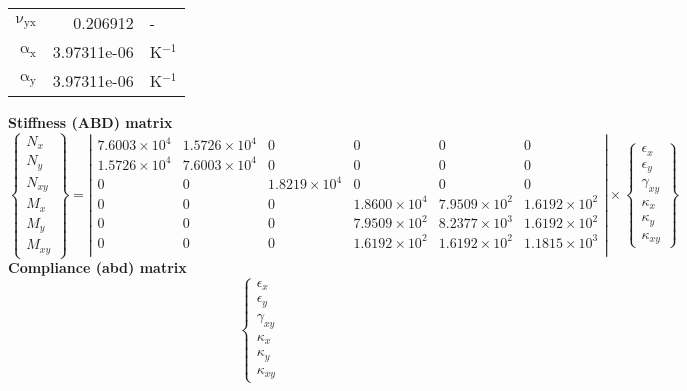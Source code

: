 \begin{table}[!htbp]
\begin{tabular}[t]{rrl}
      $\mathrm{\nu_{yx}}$ & 0.206912 &-\\
      $\mathrm{\alpha_x}$ & 3.97311e-06 & K$^{-1}$\\
      $\mathrm{\alpha_y}$ & 3.97311e-06 & K$^{-1}$\\
      \bottomrule
    \end{tabular}
  \vbox{
    \vbox{\small\textbf{Stiffness (ABD) matrix}\\[-5mm]
      \tiny\[\left\{\begin{array}{c}
          N_x\\ N_y\\ N_{xy}\\ M_x\\ M_y\\ M_{xy}
        \end{array}\right\} = 
      \left|\begin{array}{cccccc}
           7.6003\times 10^{4} &  1.5726\times 10^{4} & 0 & 0 & 0 & 0\\
           1.5726\times 10^{4} &  7.6003\times 10^{4} & 0 & 0 & 0 & 0\\
          0 & 0 &  1.8219\times 10^{4} & 0 & 0 & 0\\
          0 & 0 & 0 &  1.8600\times 10^{4} &  7.9509\times 10^{2} &  1.6192\times 10^{2}\\
          0 & 0 & 0 &  7.9509\times 10^{2} &  8.2377\times 10^{3} &  1.6192\times 10^{2}\\
          0 & 0 & 0 &  1.6192\times 10^{2} &  1.6192\times 10^{2} &  1.1815\times 10^{3}\\
          \end{array}\right| \times
        \left\{\begin{array}{c}
            \epsilon_x\\[3pt] \epsilon_y\\[3pt] \gamma_{xy}\\[3pt]
            \kappa_x\\[3pt] \kappa_y\\[3pt] \kappa_{xy}
          \end{array}\right\}\]
    }
    \vbox{\small\textbf{Compliance (abd) matrix}\\[-5mm]
      \tiny\[\left\{\begin{array}{c}
            \epsilon_x\\[3pt] \epsilon_y\\[3pt] \gamma_{xy}\\[3pt]
            \kappa_x\\[3pt] \kappa_y\\[3pt] \kappa_{xy}

\end{array}\]}}
\end{table}
